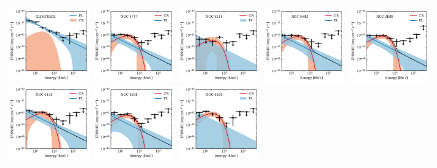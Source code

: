 \documentclass[doublespace,nopageskip]{VTthesis} %
\begin{document}
\begin{appendices}
\begin{figure}
\includegraphics[width=0.19\textwidth]{Figures/Globular/spectra/2comp_2.pdf}
\includegraphics[width=0.19\textwidth]{Figures/Globular/spectra/2comp_23.pdf}
\includegraphics[width=0.19\textwidth]{Figures/Globular/spectra/2comp_10.pdf}
\includegraphics[width=0.19\textwidth]{Figures/Globular/spectra/2comp_17.pdf}
\includegraphics[width=0.19\textwidth]{Figures/Globular/spectra/2comp_5.pdf}
\includegraphics[width=0.19\textwidth]{Figures/Globular/spectra/2comp_9.pdf}
\includegraphics[width=0.19\textwidth]{Figures/Globular/spectra/2comp_25.pdf}
\includegraphics[width=0.19\textwidth]{Figures/Globular/spectra/2comp_12.pdf}

\end{figure}
\end{appendices}
\end{document}
